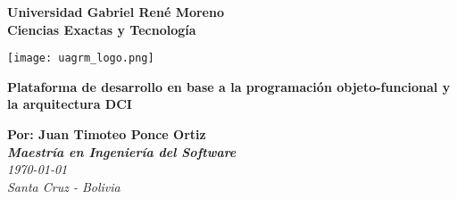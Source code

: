 \thispagestyle{empty}
\begin{center}        
  \LARGE
  \textbf{Universidad Gabriel Ren\'e Moreno\\Ciencias Exactas y Tecnolog\'ia} \\
  \vspace{15mm}
  \centerline{\texttt{[image: uagrm\_logo.png]}}
  \vspace{5mm}
  \vspace{5mm}
  \Large
  {\bf{Plataforma de desarrollo en base a la programaci\'on objeto-funcional y la arquitectura DCI}} \\
  \vspace{10mm}

  \vspace{5mm}
  \large
  \textbf{Por: Juan Timoteo Ponce Ortiz} \\  
  {\bf{\textsl{Maestr\'ia en Ingenier\'ia del Software}}} \\
  \vspace{10mm}  
  \large
  \textsl{\today} 
  \\
  \normalsize
  \textsl{Santa Cruz - Bolivia} 
\end{center}
